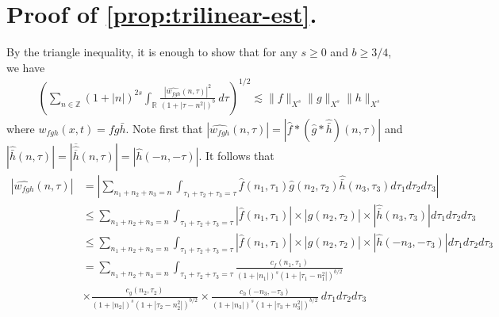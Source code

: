 \documentclass[12pt,reqno]{amsart}
\numberwithin{equation}{section}  %
\numberwithin{figure}{section}
\newcommand{\rr}{\mathbb{R}}
\newcommand{\zz}{\mathbb{Z}}
\newcommand{\wh}{\widehat}
\theoremstyle{plain}
\theoremstyle{definition}
\theoremstyle{remark}
\begin{document}
\section{Proof of \autoref{prop:trilinear-est}.}
%
%
By the triangle inequality, it is enough to show that for any $s \ge 0$ and $b
\ge 3/4$, we have
  \begin{equation}
    \label{trilin-est-simp}
    \begin{split}
    & \left( \sum_{n \in \zz} \left (1 + |n| \right )^{2s} \int_\rr
    \frac{|\wh{{w}_{fgh}}(n, \tau) |^2}{\left (1+ |\tau - 
    n^{2}| \right ) ^b} 
     \ d \tau 
    \right)^{1/2}
    \lesssim \|f\|_{X^s} \| g\|_{X^s}
    \| h \|_{X^s}
  \end{split}
  \end{equation}
  where $w_{fgh}(x,t) = f g \bar{h}$.
%
%
%
%
Note first that $|\wh{{w}_{fgh}}(n, \tau) |  = | \wh{f} * ( \wh{g} 
* \wh{\bar h})(n, \tau)|$ and $| \wh{\bar{h}}(n, \tau) | = |\overline{ \wh{\overline{h}} 
}(n, \tau)| = | \wh{h}(-n, -\tau) |$. It follows that
%
%
\begin{equation}
  \label{non-lin-rep}
  \begin{split}
    | \wh{{w}_{fgh}}(n, \tau)|
    & = | \sum_{n_1 + n_2 + n_3 = n}  \int_{\tau_1 + \tau_2 + \tau_3 = \tau} \wh{f}\left( n_1,  \tau_1 
\right) \wh{g}\left( n_2, \tau_2  
\right) \wh{\bar h}\left( n_3, \tau_3 \right) d \tau_1 d \tau_2 d \tau_3 |
\\
& \le \sum_{n_1 + n_2 + n_3 = n}  \int_{\tau_1 + \tau_2 + \tau_3 = \tau} | \wh{f}\left( n_1, \tau_1 
\right) | \times  | \wh{g}\left( n_2, \tau_2 
\right) | \times | \wh{\bar h}\left( n_3, \tau_3 \right) | d \tau_1 d \tau_2 d 
\tau_3
\\
& \le \sum_{n_1 + n_2 + n_3 = n}  \int_{\tau_1 + \tau_2 + \tau_3 = \tau} | \wh{f}\left( n_1, \tau_1 
\right) | \times | \wh{g}\left( n_2, \tau_2 
\right) | \times | \wh{h}\left( -n_3, - \tau_3 \right) | d \tau_1 d \tau_2 d 
\tau_3
\\
& = \sum_{n_1 + n_2 + n_3 = n} \int_{\tau_1 + \tau_2 + \tau_3 = \tau} \frac{c_f\left( n_1, \tau_1 
\right)}{\left (1 + |n_1| \right )^s \left( 1 + | \tau_1 - n_1^2 | \right)^{b/2}}
\\
& \times \frac{c_{g}\left( n_2, \tau_2 \right)}{\left (1 + |n_2| \right ) 
^s\left( 1 + | \tau_2 -  n_2^2| 
\right)^{b/2}}
 \times \frac{c_{h}\left( -n_3, -\tau_3 \right)}{\left (1 + |n_3| \right ) ^s\left( 1 + | 
\tau_3 + n_3^2 | \right)^{b/2}} \ d \tau_1 d \tau_2 d \tau_3
\end{split}
\end{equation}
\end{document}
